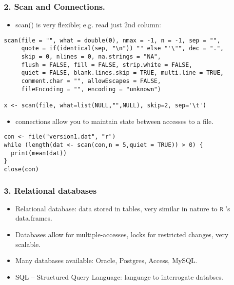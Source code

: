 \documentclass{beamer}
\newcommand{\R}{\texttt{R} }
\begin{document}
\begin{frame}[fragile]
\frametitle{2. Scan and Connections.}
\label{sec-4-3}


\begin{itemize}
\item scan() is very flexible; e.g. read just 2nd column:
\end{itemize}
\footnotesize

\begin{verbatim}
scan(file = "", what = double(0), nmax = -1, n = -1, sep = "",
     quote = if(identical(sep, "\n")) "" else "'\"", dec = ".",
     skip = 0, nlines = 0, na.strings = "NA",
     flush = FALSE, fill = FALSE, strip.white = FALSE,
     quiet = FALSE, blank.lines.skip = TRUE, multi.line = TRUE,
     comment.char = "", allowEscapes = FALSE,
     fileEncoding = "", encoding = "unknown")

x <- scan(file, what=list(NULL,"",NULL), skip=2, sep='\t')
\end{verbatim}
\normalsize

\begin{itemize}
\item connections allow you to maintain state between accesses to a file.
\end{itemize}

\footnotesize

\begin{verbatim}
con <- file("version1.dat", "r")
while (length(dat <- scan(con,n = 5,quiet = TRUE)) > 0) {
  print(mean(dat))
}
close(con)
\end{verbatim}
\end{frame}
\begin{frame}
\frametitle{3. Relational databases}
\label{sec-4-4}


\begin{itemize}
\item Relational database: data stored in tables, very similar in nature
  to \R's data.frames.
\item Databases allow for multiple-accesses, locks for restricted changes,
  very scalable.
\item Many databases available: Oracle, Postgres, Access, MySQL.
\item SQL -- Structured Query Language: language to interrogate databses.
\end{itemize}
\end{frame}
\end{document}
